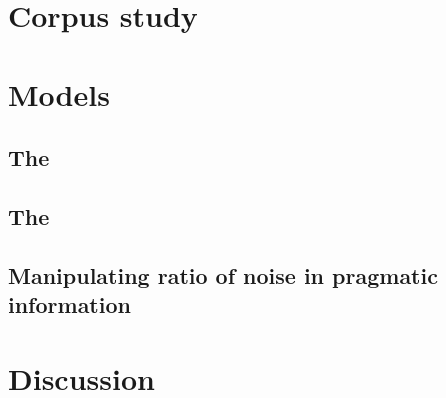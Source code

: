 \section{Corpus study}

\section{Models}
\subsection{The \distlearner{}}
\subsection{The \praglearner{}}
\subsection{Manipulating ratio of noise in pragmatic information}

\section{Discussion}






